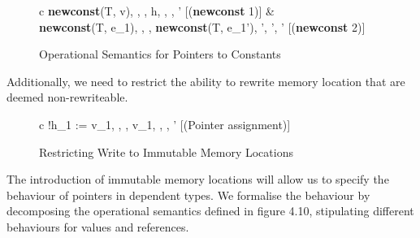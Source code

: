 \documentclass[a4paper,12pt]{report}
\begin{document}
\begin{figure}[H]
  \begin{center}
    \begin{tabular} {c}
      {\langle \textbf{newconst}(T, v), \sigma, \tau, \Delta \rangle \longrightarrow \langle h, 
      \sigma, \tau, \Delta' \rangle} [(\textbf{newconst} 1)]
      & \\
      {\langle \textbf{newconst}(T, e_1), \sigma, \tau, \Delta \rangle \longrightarrow \langle \textbf{newconst}(T, e_1'), 
      \sigma', \tau', \Delta' \rangle} [(\textbf{newconst} 2)]
    \end{tabular}
  \end{center}
  \caption{Operational Semantics for Pointers to Constants}
\end{figure}

\par
Additionally, we need to restrict the ability to rewrite memory location that 
are deemed non-rewriteable. 

\begin{figure}[H]
  \begin{center}
    \begin{tabular} {c}
      {\langle !h_1 := v_1, \sigma, \tau, \Delta \rangle \longrightarrow \langle v_1, 
      \sigma, \tau, \Delta' \rangle} [(Pointer assignment)]
    \end{tabular}
  \end{center}
  \caption{Restricting Write to Immutable Memory Locations}
\end{figure}


\par
The introduction of immutable memory locations will allow us to specify the 
behaviour of pointers in dependent types. We formalise the behaviour by 
decomposing the operational semantics defined in figure 4.10, 
stipulating different behaviours for values and references. 
\end{document}
